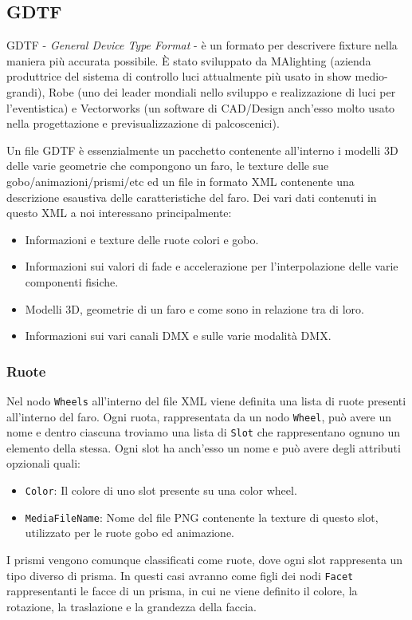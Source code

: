 \documentclass[main.tex]{subfiles}
\begin{document}
\subsection{GDTF}\label{subsec:1_gdtf}
GDTF - \textit{General Device Type Format} - è un formato per descrivere fixture nella maniera più accurata possibile. È stato sviluppato da MAlighting (azienda produttrice del sistema di controllo luci attualmente più usato in show medio-grandi), Robe (uno dei leader mondiali nello sviluppo e realizzazione di luci per l'eventistica) e Vectorworks (un software di CAD/Design anch'esso molto usato nella progettazione e previsualizzazione di palcoscenici). 
\newline

\noindent Un file GDTF è essenzialmente un pacchetto contenente all'interno i modelli 3D delle varie geometrie che compongono un faro, le texture delle sue gobo/animazioni/prismi/etc ed un file in formato XML contenente una descrizione esaustiva delle caratteristiche del faro. \newline
Dei vari dati contenuti in questo XML a noi interessano principalmente:
\begin{itemize}
    \item Informazioni e texture delle ruote colori e gobo.
    \item Informazioni sui valori di fade e accelerazione per l'interpolazione delle varie componenti fisiche.
    \item Modelli 3D, geometrie di un faro e come sono in relazione tra di loro.
    \item Informazioni sui vari canali DMX e sulle varie modalità DMX.
\end{itemize}

\subsubsection{Ruote}\label{subsec:1_2_wheels}
Nel nodo \lstinline{Wheels} all'interno del file XML viene definita una lista di ruote presenti all'interno del faro. Ogni ruota, rappresentata da un nodo \lstinline{Wheel}, può avere un nome e dentro ciascuna troviamo una lista di \lstinline{Slot} che rappresentano ognuno un elemento della stessa. Ogni slot ha anch'esso un nome e può avere degli attributi opzionali quali:
\begin{itemize}
    \item \lstinline{Color}: Il colore di uno slot presente su una color wheel.
    \item \lstinline{MediaFileName}: Nome del file PNG contenente la texture di questo slot, utilizzato per le ruote gobo ed animazione.
\end{itemize}
I prismi vengono comunque classificati come ruote, dove ogni slot rappresenta un tipo diverso di prisma. In questi casi avranno come figli dei nodi \lstinline{Facet} rappresentanti le facce di un prisma, in cui ne viene definito il colore, la rotazione, la traslazione e la grandezza della faccia.
\end{document}
